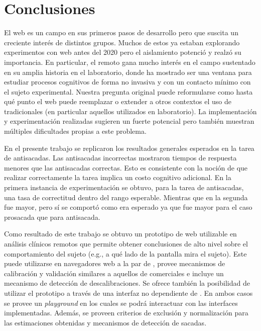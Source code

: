 \chapter{Conclusiones}

El \eyetracking web es un campo en sus primeros pasos de desarrollo pero que
suscita un creciente interés de distintos grupos.
Muchos de estos ya estaban explorando experimentos con \eyetracking web antes
del 2020 pero el aislamiento potenció y realzó su importancia.
En particular, el \eyetracking remoto gana mucho interés en el campo sustentado
en su amplia historia en el laboratorio, donde ha mostrado ser una ventana para
estudiar procesos cognitivos de forma no invasiva y con un contacto mínimo con
el sujeto experimental.
Nuestra pregunta original puede reformularse como hasta qué punto el
\eyetracking web puede reemplazar o extender a otros contextos el uso de
\eyetrackers tradicionales (en particular aquellos utilizados en laboratorio).
La implementación y experimentación realizadas sugieren un fuerte potencial
pero también muestran múltiples dificultades propias a este problema.

En el presente trabajo se replicaron los resultados generales esperados en la
tarea de antisacadas.
Las antisacadas incorrectas mostraron tiempos de respuesta menores que las
antisacadas correctas.
Esto es consistente con la noción de que realizar correctamente la tarea
implica un costo cognitivo adicional.
En la primera instancia de experimentación se obtuvo, para la tarea de
antisacadas, una tasa de correctitud dentro del rango esperable.
Mientras que en la segunda fue mayor, pero sí se comportó como era esperado ya
que fue mayor para el caso prosacada que para antisacada.

Como resultado de este trabajo se obtuvo un prototipo de \eyetracker web
utilizable en análisis clínicos remotos que permite obtener conclusiones de
alto nivel sobre el comportamiento del sujeto (e.g., a qué lado de la pantalla
mira el sujeto).
Este puede utilizarse en navegadores web a la par de \jspsych, provee
mecanismos de calibración y validación similares a aquellos de \eyetrackers
comerciales e incluye un mecanismo de detección de descalibraciones.
Se ofrece también la posibilidad de utilizar el prototipo a través de una
interfaz no dependiente de \jspsych.
En ambos casos se provee un \textit{playground} en los cuales se podrá
interactuar con las interfaces implementadas.
Además, se proveen criterios de exclusión y normalización para las estimaciones
obtenidas y mecanismos de detección de sacadas.

